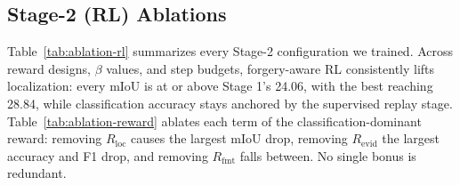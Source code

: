 \documentclass[10pt,twocolumn,letterpaper]{article}
\newcommand{\bridge}{\textsc{Bridge}}
\newcommand{\medforge}{\textsc{MedForge}}
\begin{document}
\begin{table}[h]
\centering
\small
{}
\caption{\bridge{} on \medforge{}-90K, same class/regime structure as the main paper's per-class table, with all three regimes fully resolved. Cross-Forgery and In-Domain use the $\alpha{=}0.15$ interpolation (Stage 3); Cross-Model uses the Stage-2 GRPO model $W_{\mathrm{RL}}$ directly. The Avg column is the mean across the three regimes.}
\label{tab:bridge-medforge}
\end{table}

\subsection{Stage-2 (RL) Ablations}
Table~\ref{tab:ablation-rl} summarizes every Stage-2 configuration we trained. Across reward designs, $\beta$ values, and step budgets, forgery-aware RL consistently lifts localization: every mIoU is at or above Stage 1's 24.06, with the best reaching 28.84, while classification accuracy stays anchored by the supervised replay stage. Table~\ref{tab:ablation-reward} ablates each term of the classification-dominant reward: removing $R_{\mathrm{loc}}$ causes the largest mIoU drop, removing $R_{\mathrm{evid}}$ the largest accuracy and F1 drop, and removing $R_{\mathrm{fmt}}$ falls between. No single bonus is redundant.
\end{document}
